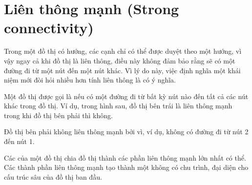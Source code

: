 \chapter{Liên thông mạnh (Strong connectivity)}


Trong một đồ thị có hướng,
các cạnh chỉ có thể được duyệt theo một hướng,
vì vậy ngay cả khi đồ thị là liên thông,
điều này không đảm bảo rằng sẽ có
một đường đi từ một nút đến một nút khác.
Vì lý do này, việc định nghĩa một khái niệm mới
đòi hỏi nhiều hơn tính liên thông là có ý nghĩa.

Một đồ thị được gọi là 
nếu có một đường đi từ bất kỳ nút nào đến tất cả
các nút khác trong đồ thị.
Ví dụ, trong hình sau,
đồ thị bên trái là liên thông mạnh
trong khi đồ thị bên phải thì không.

\begin{center}
\end{center}

Đồ thị bên phải không liên thông mạnh
bởi vì, ví dụ, không có đường đi
từ nút 2 đến nút 1.


Các 
của một đồ thị chia đồ thị thành các phần liên thông mạnh
lớn nhất có thể.
Các thành phần liên thông mạnh tạo thành một
 không có chu trình, đại diện cho
cấu trúc sâu của đồ thị ban đầu.

